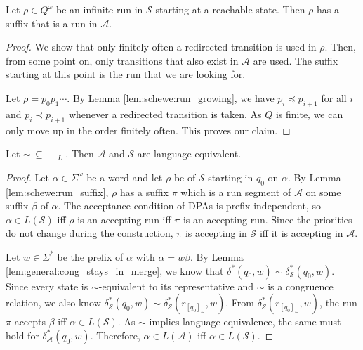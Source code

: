 \begin{lem}
\label{lem:schewe:run_suffix}
	Let $\rho \in Q^\omega$ be an infinite run in $\mathcal{S}$ starting at a reachable state. Then $\rho$ has a suffix that is a run in $\mathcal{A}$.
\end{lem} 

\begin{proof}
	We show that only finitely often a redirected transition is used in $\rho$. Then, from some point on, only transitions that also exist in $\mathcal{A}$ are used. The suffix starting at this point is the run that we are looking for.
	
	Let $\rho = p_0 p_1 \cdots$. By Lemma \ref{lem:schewe:run_growing}, we have $p_i \preceq p_{i+1}$ for all $i$ and $p_i \prec p_{i+1}$ whenever a redirected transition is taken. As $Q$ is finite, we can only move up in the order finitely often. This proves our claim.
\end{proof}


\begin{theorem}
	Let $\sim \,\subseteq\, \equiv_L$. Then $\mathcal{A}$ and $\mathcal{S}$ are language equivalent.
\end{theorem}

\begin{proof}
	Let $\alpha \in \Sigma^\omega$ be a word and let $\rho$ be of $\mathcal{S}$ starting in $q_0$ on $\alpha$. By Lemma \ref{lem:schewe:run_suffix}, $\rho$ has a suffix $\pi$ which is a run segment of $\mathcal{A}$ on some suffix $\beta$ of $\alpha$. The acceptance condition of DPAs is prefix independent, so $\alpha \in L(\mathcal{S})$ iff $\rho$ is an accepting run iff $\pi$ is an accepting run. Since the priorities do not change during the construction, $\pi$ is accepting in $\mathcal{S}$ iff it is accepting in $\mathcal{A}$.
	
	Let $w \in \Sigma^*$ be the prefix of $\alpha$ with $\alpha = w \beta$. By Lemma \ref{lem:general:cong_stays_in_merge}, we know that $\delta^*(q_0, w) \sim \delta^*_\mathcal{S}(q_0, w)$. Since every state is $\sim$-equivalent to its representative and $\sim$ is a congruence relation, we also know $\delta^*_\mathcal{S}(q_0, w) \sim \delta^*_\mathcal{S}(r_{[q_0]_\sim}, w)$. From $\delta^*_\mathcal{S}(r_{[q_0]_\sim}, w)$, the run $\pi$ accepts $\beta$ iff $\alpha \in L(\mathcal{S})$. As $\sim$ implies language equivalence, the same must hold for $\delta^*_\mathcal{A}(q_0, w)$. Therefore, $\alpha \in L(\mathcal{A})$ iff $\alpha \in L(\mathcal{S})$.
\end{proof}

